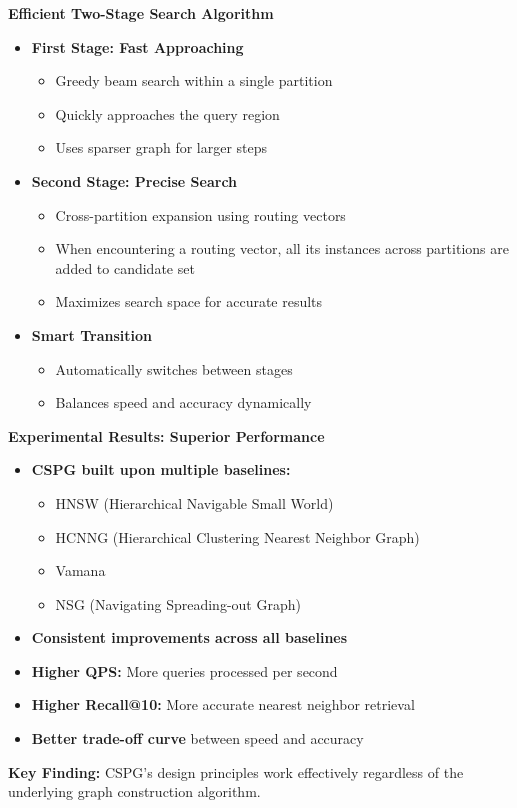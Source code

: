 \begin{frame}
\textbf{Efficient Two-Stage Search Algorithm}

\begin{itemize}
\item \textbf{First Stage: Fast Approaching}
\begin{itemize}
\item Greedy beam search within a single partition
\item Quickly approaches the query region
\item Uses sparser graph for larger steps
\end{itemize}

\item \textbf{Second Stage: Precise Search}
\begin{itemize}
\item Cross-partition expansion using routing vectors
\item When encountering a routing vector, all its instances across partitions are added to candidate set
\item Maximizes search space for accurate results
\end{itemize}

\item \textbf{Smart Transition}
\begin{itemize}
\item Automatically switches between stages
\item Balances speed and accuracy dynamically
\end{itemize}
\end{itemize}
\end{frame}%
\begin{frame}
\textbf{Experimental Results: Superior Performance}

\begin{itemize}
\item \textbf{CSPG built upon multiple baselines:}
\begin{itemize}
\item HNSW (Hierarchical Navigable Small World)
\item HCNNG (Hierarchical Clustering Nearest Neighbor Graph)
\item Vamana
\item NSG (Navigating Spreading-out Graph)
\end{itemize}

\item \textbf{Consistent improvements across all baselines}
\item \textbf{Higher QPS:} More queries processed per second
\item \textbf{Higher Recall@10:} More accurate nearest neighbor retrieval
\item \textbf{Better trade-off curve} between speed and accuracy
\end{itemize}

\vspace{10pt}

\textbf{Key Finding:} CSPG's design principles work effectively regardless of the underlying graph construction algorithm.
\end{frame}%

